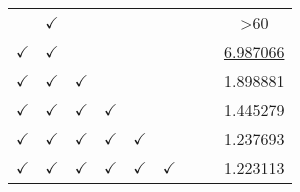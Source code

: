 \begin{table}
\begin{threeparttable}
\begin{tabular}{cccccccc|c}
              & $\checkmark$                                     &                                                   &                                                 &                                                   &                                                  &                                                   &                                                 & \textgreater{}60     \\
$\checkmark$ & $\checkmark$                                     &                                                  &                                                 &                                                   &                                                  &                                                   &                                                 & \underline{6.987066} \\
$\checkmark$ & $\checkmark$                                     &$\checkmark$                                                   &                                                 &                                                   &                                                  &                                                   &                                                 & 1.898881 \\
$\checkmark$ & $\checkmark$                                     &$\checkmark$                                                   & $\checkmark$                                    &                                                   &                                                  &                                                   &                                                 & 1.445279       \\
$\checkmark$ & $\checkmark$                                     &$\checkmark$                                                   & $\checkmark$                                    & $\checkmark$                                      &                                                  &                                                   &                                                 & 1.237693       \\
$\checkmark$ & $\checkmark$                                     &$\checkmark$                                                   & $\checkmark$                                    & $\checkmark$                                      & $\checkmark$                                     &                                                   &                                                 & 1.223113       \\

\end{tabular}
\end{threeparttable}
\end{table}
